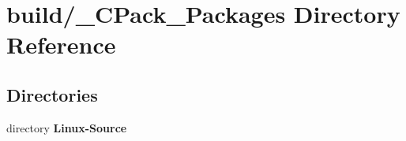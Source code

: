\section{build/\-\_\-\-C\-Pack\-\_\-\-Packages Directory Reference}
\label{dir_b048026938d7a732b9389a92ef8d8a24}
\subsection*{Directories}
\begin{DoxyCompactItemize}
\item 
directory {\bf Linux-\/\-Source}
\end{DoxyCompactItemize}
